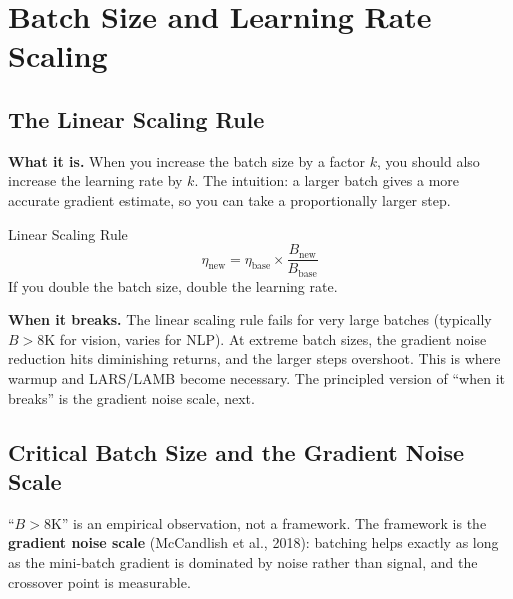 \section{Batch Size and Learning Rate Scaling}
\label{sec:batch_scaling}

\subsection{The Linear Scaling Rule}

\textbf{What it is.} When you increase the batch size by a factor $k$, you should also increase the learning rate by $k$. The intuition: a larger batch gives a more accurate gradient estimate, so you can take a proportionally larger step.

\begin{mathresult}{Linear Scaling Rule}
\begin{equation}
\eta_{\text{new}} = \eta_{\text{base}} \times \frac{B_{\text{new}}}{B_{\text{base}}}
\end{equation}
If you double the batch size, double the learning rate.
\end{mathresult}

\textbf{When it breaks.} The linear scaling rule fails for very large batches (typically $B > 8\text{K}$ for vision, varies for NLP). At extreme batch sizes, the gradient noise reduction hits diminishing returns, and the larger steps overshoot. This is where warmup and LARS/LAMB become necessary. The principled version of ``when it breaks'' is the gradient noise scale, next.

\subsection{Critical Batch Size and the Gradient Noise Scale}
\label{subsec:critical_batch}

``$B > 8$K'' is an empirical observation, not a framework. The framework is the \textbf{gradient noise scale} (McCandlish et al., 2018): batching helps exactly as long as the mini-batch gradient is dominated by noise rather than signal, and the crossover point is measurable.

